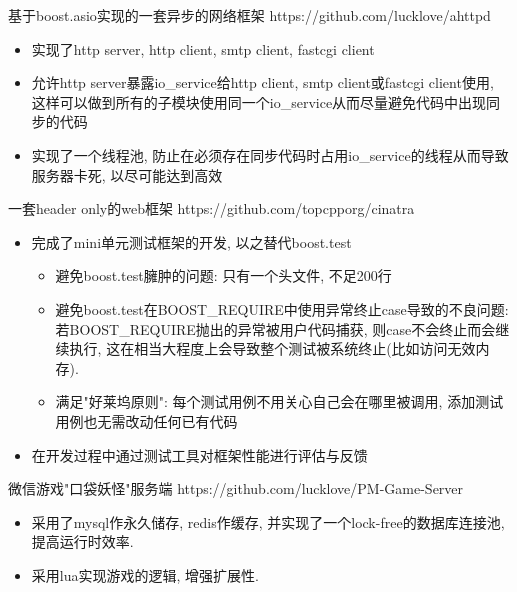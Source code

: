 \documentclass{resume}
\begin{document}
\begin{onehalfspacing}
基于boost.asio实现的一套异步的网络框架
\newline
https://github.com/lucklove/ahttpd
\begin{itemize}
  \item 实现了http server, http client, smtp client, fastcgi client
  \item 允许http server暴露io\_service给http client, smtp client或fastcgi client使用, 这样可以做到所有的子模块使用同一个io\_service从而尽量避免代码中出现同步的代码
  \item 实现了一个线程池, 防止在必须存在同步代码时占用io\_service的线程从而导致服务器卡死, 以尽可能达到高效
\end{itemize}
\end{onehalfspacing}


\begin{onehalfspacing}
一套header only的web框架 
\newline
https://github.com/topcpporg/cinatra
\begin{itemize}
  \item 完成了mini单元测试框架的开发, 以之替代boost.test
  \begin{itemize}
    \item 避免boost.test臃肿的问题: 只有一个头文件, 不足200行
    \item 避免boost.test在BOOST\_REQUIRE中使用异常终止case导致的不良问题: \newline 若BOOST\_REQUIRE抛出的异常被用户代码捕获, 则case不会终止而会继续执行, 这在相当大程度上会导致整个测试被系统终止(比如访问无效内存).
    \item 满足"好莱坞原则": 每个测试用例不用关心自己会在哪里被调用, 添加测试用例也无需改动任何已有代码
  \end{itemize}
  \item 在开发过程中通过测试工具对框架性能进行评估与反馈
\end{itemize}
\end{onehalfspacing}

\begin{onehalfspacing}
微信游戏"口袋妖怪"服务端
\newline
https://github.com/lucklove/PM-Game-Server
\begin{itemize}
  \item 采用了mysql作永久储存, redis作缓存, 并实现了一个lock-free的数据库连接池, 提高运行时效率.
  \item 采用lua实现游戏的逻辑, 增强扩展性.
\end{itemize}
\end{onehalfspacing}
\end{document}
